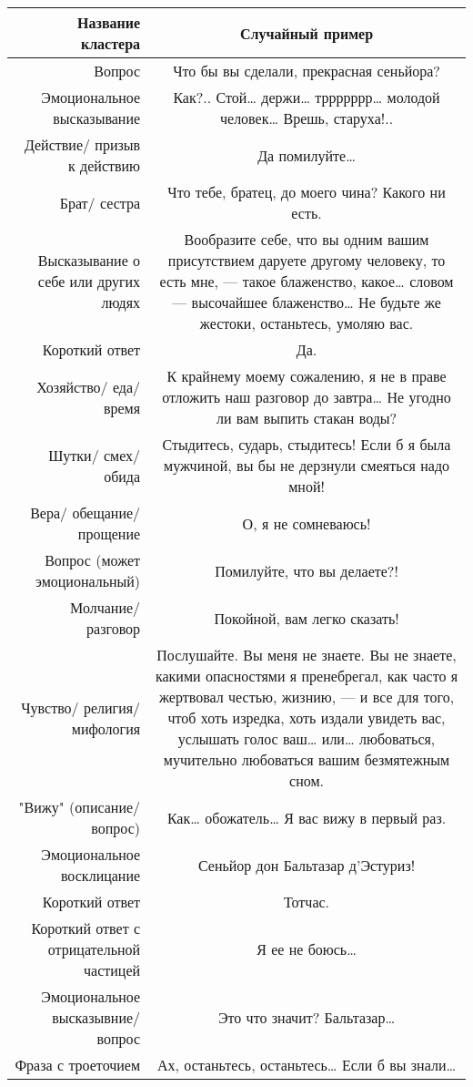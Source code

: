 \documentclass[a4paper,14pt]{article}
\begin{document}
\begin{center}
\begin{tabularx}{\linewidth}{ | N | C | }
\hline
Название кластера&Случайный пример \\
\hline
Вопрос&Что бы вы сделали, прекрасная сеньйора?\\ \hline
Эмоциональное высказывание&Как?.. Стой… держи… тррррррр… молодой человек… Врешь, старуха!..\\ \hline
Действие/ призыв к действию&Да помилуйте…\\ \hline
Брат/ сестра&Что тебе, братец, до моего чина? Какого ни есть.\\ \hline
Высказывание о себе или других людях&Вообразите себе, что вы одним вашим присутствием даруете другому человеку, то есть мне,             — такое блаженство, какое… словом — высочайшее блаженство… Не будьте же жестоки,             останьтесь, умоляю вас.\\ \hline
Короткий ответ&Да.\\ \hline
Хозяйство/ еда/ время&К крайнему моему сожалению, я не в праве отложить наш разговор до завтра… Не угодно ли вам выпить стакан воды?\\ \hline
Шутки/ смех/ обида&Стыдитесь, сударь, стыдитесь! Если б я была мужчиной, вы бы не дерзнули смеяться надо             мной!\\ \hline
Вера/ обещание/ прощение&О, я не сомневаюсь!\\ \hline
Вопрос (может эмоциональный)&Помилуйте, что вы делаете?!\\ \hline
Молчание/ разговор&Покойной, вам легко сказать!\\ \hline
Чувство/ религия/ мифология&Послушайте. Вы меня не знаете. Вы не знаете, какими опасностями я пренебрегал, как часто я жертвовал честью, жизнию, — и все для того, чтоб хоть изредка, хоть издали             увидеть вас, услышать голос ваш… или…  любоваться, мучительно любоваться вашим безмятежным сном.  \\ \hline
"Вижу" (описание/ вопрос)&Как… обожатель… Я вас вижу в первый раз.\\ \hline
Эмоциональное восклицание&Сеньйор дон Бальтазар д'Эстуриз!\\ \hline
Короткий ответ&Тотчас.\\ \hline
Короткий ответ с отрицательной частицей&Я ее не боюсь…\\ \hline
Эмоциональное высказывние/ вопрос&Это что значит? Бальтазар…\\ \hline
Фраза с троеточием &Ах, останьтесь, останьтесь… Если б вы знали…\\ \hline

\end{tabularx}
\end{center}
\end{document}
